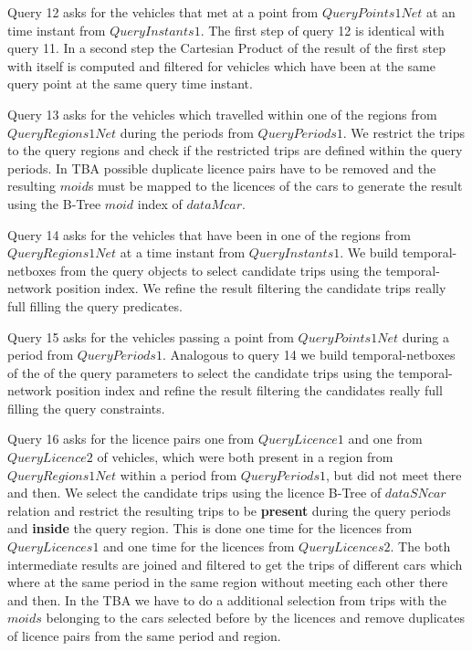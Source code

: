\documentclass[a4paper]{article}
\newcommand{\op}[1]{\textbf{#1}}
\begin{document}
{Query 12 asks for the vehicles that met at a point from $QueryPoints1Net$ at an time
instant from $QueryInstants1$. The first step of query 12 is identical with query 11.
In a second step the Cartesian Product of the result of the first step with itself
is computed and filtered for vehicles which have been at the same query point
at the same query time instant.

Query 13 asks for the vehicles which travelled within one of the regions from
$QueryRegions1Net$ during the periods from $QueryPeriods1$. We restrict the trips
to the query regions and check if the restricted trips are defined within the query
periods. In TBA possible duplicate licence pairs have to be removed and the
resulting $moid$s must be mapped to the licences of the cars to generate the result
using the B-Tree $moid$ index of $dataMcar$.

Query 14 asks for the vehicles that have been in one of the regions from $QueryRegions1Net$
at a time instant from $QueryInstants1$. We build temporal-netboxes from the query
objects to select candidate trips using the temporal-network position index. We refine the
result filtering the candidate trips really full filling the query predicates.

Query 15 asks for the vehicles passing a point from $QueryPoints1Net$ during a period
from $QueryPeriods1$. Analogous to query 14 we build temporal-netboxes of the
of the query parameters to select the candidate trips using the temporal-network
position index and refine the result filtering the candidates really full filling
the query constraints.

Query 16 asks for the licence pairs one from $QueryLicence1$ and one from $QueryLicence2$
of vehicles, which were both present in a region from $QueryRegions1Net$ within a period
from $QueryPeriods1$, but did not meet there and then. We select the candidate trips
using the licence B-Tree of $dataSNcar$ relation and restrict the resulting trips to be
\op{present} during the query periods and \op{inside} the query region. This is done
one time for the licences from $QueryLicences1$ and one time for the licences from
$QueryLicences2$. The both intermediate results are joined and filtered to get the
trips of different cars which where at the same period in the same region
without meeting each other there and then. In the TBA we have
to do a additional selection from trips with the $moids$ belonging to the cars
selected before by the licences and remove duplicates of licence pairs from the
same period and region.

}
\end{document}

